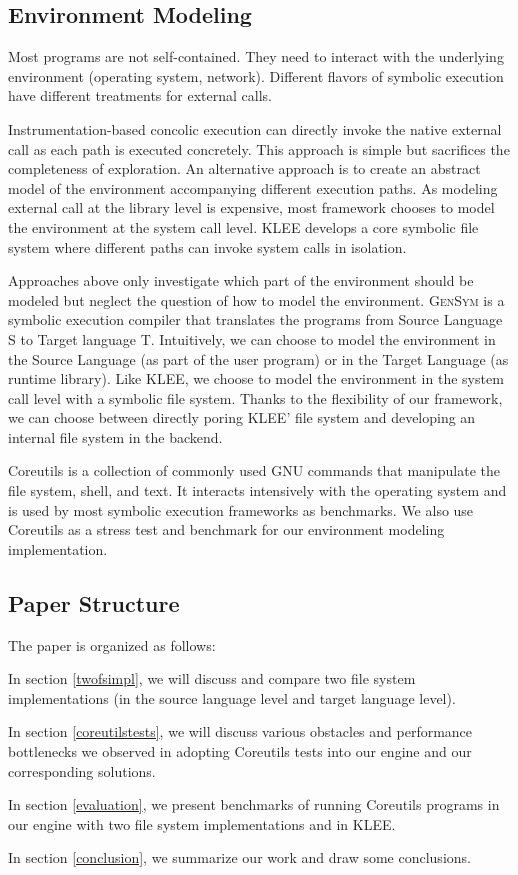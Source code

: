 \documentclass[sigplan, nonacm]{acmart}\settopmatter{printfolios=true,printccs=false,printacmref=false}
\newcommand{\tool}{\textsc{GenSym}\xspace}
\begin{document}
\subsection{Environment Modeling}
Most programs are not self-contained. They need to interact with the underlying environment (operating system, network). Different flavors of symbolic execution have different treatments for external calls. \par
Instrumentation-based concolic execution can directly invoke the native external call as each path is executed concretely. This approach is simple but sacrifices the completeness of exploration. An alternative approach is to create an abstract model of the environment accompanying different execution paths. As modeling external call at the library level is expensive, most framework chooses to model the environment at the system call level.
 KLEE\cite{cadar2008klee} develops a core symbolic file system where different paths can invoke system calls in isolation. \par
Approaches above only investigate which part of the environment should be modeled but neglect the question of how to model the environment. \tool is a symbolic execution compiler that translates the programs from Source Language S to Target language T. Intuitively, we can choose to model the environment in the Source Language (as part of the user program) or in the Target Language (as runtime library). Like KLEE, we choose to model the environment in the system call level with a symbolic file system. Thanks to the flexibility of our framework, we can choose between directly poring KLEE' file system and developing an internal file system in the backend.\par
Coreutils \cite{coreutilsweb} is a collection of commonly used GNU commands that manipulate the file system, shell, and text. It interacts intensively with the operating system and is used by most symbolic execution frameworks as benchmarks. We also use Coreutils as a stress test and benchmark for our environment modeling implementation.
\subsection{Paper Structure}
The paper is organized as follows: \par \par
In section \ref{twofsimpl}, we will discuss and compare two file system implementations (in the source language level and target language level).\par
In section \ref{coreutilstests}, we will discuss various obstacles and performance bottlenecks we observed in adopting Coreutils tests into our engine and our corresponding solutions.\par
In section \ref{evaluation}, we present benchmarks of running Coreutils programs in our engine with two file system implementations and in KLEE.\par
In section \ref{conclusion}, we summarize our work and draw some conclusions.
\end{document}
